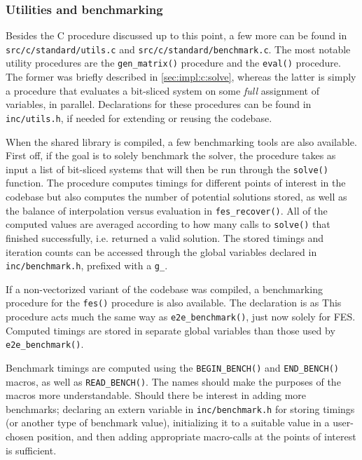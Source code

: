 \subsubsection{Utilities and benchmarking} \label{sec:impl:c:util_bench}
Besides the C procedure discussed up to this point, a few more can be found in \texttt{src/c/standard/utils.c} and \texttt{src/c/standard/benchmark.c}. The most notable utility procedures are the \texttt{gen\_matrix()} procedure and the \texttt{eval()} procedure. The former was briefly described in \cref{sec:impl:c:solve}, whereas the latter is simply a procedure that evaluates a bit-sliced system on some \textit{full} assignment of variables, in parallel. Declarations for these procedures can be found in \texttt{inc/utils.h}, if needed for extending or reusing the codebase.

When the shared library is compiled, a few benchmarking tools are also available. First off, if the goal is to solely benchmark the solver, the procedure 
takes as input a list of bit-sliced systems that will then be run through the \texttt{solve()} function. The procedure computes timings for different points of interest in the codebase but also computes the number of potential solutions stored, as well as the balance of interpolation versus evaluation in \texttt{fes\_recover()}. All of the computed values are averaged according to how many calls to \texttt{solve()} that finished successfully, i.e. returned a valid solution. The stored timings and iteration counts can be accessed through the global variables declared in \texttt{inc/benchmark.h}, prefixed with a \texttt{g\_}. 

If a non-vectorized variant of the codebase was compiled, a benchmarking procedure for the \texttt{fes()} procedure is also available. The declaration is as
This procedure acts much the same way as \texttt{e2e\_benchmark()}, just now solely for FES. Computed timings are stored in separate global variables than those used by \texttt{e2e\_benchmark()}.

Benchmark timings are computed using the \texttt{BEGIN\_BENCH()} and \texttt{END\_BENCH()} mac\-ros, as well as \texttt{READ\_BENCH()}. The names should make the purposes of the macros more understandable. Should there be interest in adding more benchmarks; declaring an extern variable in \texttt{inc/benchmark.h} for storing timings (or another type of benchmark value), initializing it to a suitable value in a user-chosen position, and then adding appropriate macro-calls at the points of interest is sufficient.
